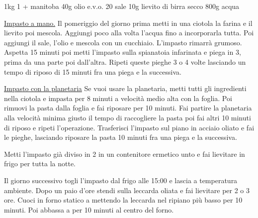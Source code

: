 \begin{ingreds}
	1kg  1 + manitoba
	40g olio e.v.o.
	20 sale
	10g lievito di birra secco
	800g acqua
\end{ingreds}

\begin{method}
\underline{Impasto a mano.} Il pomeriggio del giorno prima metti in una ciotola la farina e il lievito poi mescola. Aggiungi poco alla volta l'acqua fino a incorporarla tutta. Poi aggiungi il sale, l'olio e mescola con un cucchiaio. L'impasto rimarrà grumoso. Aspetta 15 minuti poi metti l'impasto sulla spianatoia infarinata e piega in 3, prima da una parte poi dall'altra. Ripeti queste pieghe 3 o 4 volte lasciando un tempo di riposo di 15 minuti fra una piega e la successiva.

\underline{Impasto con la planetaria} Se vuoi usare la planetaria, metti tutti gli ingredienti nella ciotola e impasta per 8 minuti a velocità medio alta con la foglia. Poi rimuovi la pasta dalla foglia e fai riposare per 10 minuti. Fai partire la planetaria alla velocità minima giusto il tempo di raccogliere la pasta poi fai altri 10 minuti di riposo e ripeti l'operazione. Trasferisci l'impasto sul piano in acciaio oliato e fai le pieghe, lasciando riposare la pasta 10 minuti fra una piega e la successiva.

Metti l'impasto già diviso in 2 in un contenitore ermetico unto e fai lievitare in frigo per tutta la notte.

Il giorno successivo togli l'impasto dal frigo alle 15:00 e lascia a temperatura ambiente. Dopo un paio d'ore stendi sulla leccarda oliata e fai lievitare per 2 o 3 ore. Cuoci in forno statico a  mettendo la leccarda nel ripiano più basso per 10 minuti. Poi abbassa a  per 10 minuti al centro del forno.





\end{method}



